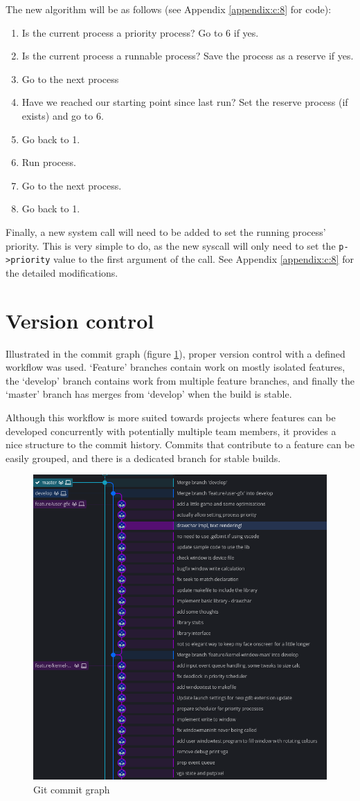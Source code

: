 \noindent The new algorithm will be as follows (see Appendix \ref{appendix:c:8} for code):
\begin{enumerate}
    \item Is the current process a priority process? Go to 6 if yes.
    \item Is the current process a runnable process? Save the process as a reserve if yes.
    \item Go to the next process
    \item Have we reached our starting point since last run? Set the reserve process (if exists) and go to 6.
    \item Go back to 1.
    \item Run process.
    \item Go to the next process.
    \item Go back to 1.
\end{enumerate}

Finally, a new system call will need to be added to set the running process' 
priority. This is very simple to do, as the new syscall will only need to set
the \texttt{p->priority} value to the first argument of the call. See
Appendix \ref{appendix:c:8} for the detailed modifications.

\section{Version control}
Illustrated in the commit graph (figure \ref{figure:commitgraph}), proper version control
with a defined workflow was used. `Feature' branches contain work on mostly isolated
features, the `develop' branch contains work from multiple feature branches, and 
finally the `master' branch has merges from `develop' when the build is stable.

Although this workflow is more suited towards projects where features can be developed
concurrently with potentially multiple team members, it provides a nice structure
to the commit history. Commits that contribute to a feature can be easily grouped,
and there is a dedicated branch for stable builds.

\begin{figure}[h]
    \centering
    \includegraphics[width=12cm]{Screenshot from 2022-04-27 12-47-49.png}
    \caption{Git commit graph}
    \label{figure:commitgraph}
\end{figure}
